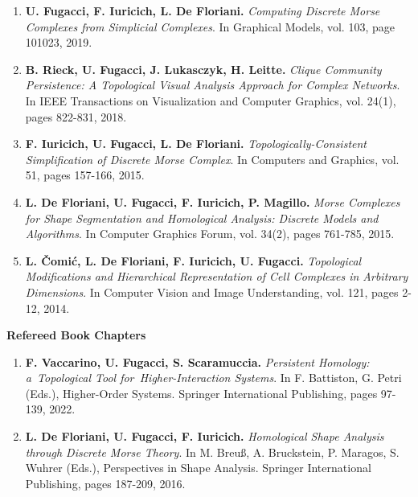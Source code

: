 \documentclass[11pt]{article}
\begin{document}
\begin{enumerate}
\item {\bf U. Fugacci, F. Iuricich, L. De Floriani.} {\em Computing Discrete Morse Complexes from Simplicial Complexes}. In Graphical Models, vol. 103, page 101023, 2019.

\item {\bf B. Rieck, U. Fugacci, J. Lukasczyk, H. Leitte.} {\em Clique Community Persistence: A Topological Visual Analysis Approach for Complex Networks}. In IEEE Transactions on Visualization and Computer Graphics, vol. 24(1), pages 822-831, 2018.

\item {\bf F. Iuricich, U. Fugacci, L. De Floriani.} {\em Topologically-Consistent Simplification of Discrete Morse Complex}. In Computers and Graphics, vol. 51, pages 157-166, 2015. %

\item {\bf L. De Floriani, U. Fugacci, F. Iuricich, P. Magillo.} {\em Morse Complexes for Shape Segmentation and Homological Analysis: Discrete Models and Algorithms}. In Computer Graphics Forum, vol. 34(2), pages 761-785, 2015.

\item {\bf L. {\v C}omi{\' c}, L. De Floriani, F. Iuricich, U. Fugacci.} {\em Topological Modifications and Hierarchical Representation of Cell Complexes in Arbitrary Dimensions}. In Computer Vision and Image Understanding, vol. 121, pages 2-12, 2014.

\end{enumerate}
\vspace*{1ex}

\noindent
{\bf Refereed Book Chapters}

\begin{enumerate}

\item {\bf F. Vaccarino, U. Fugacci, S. Scaramuccia.} {\em Persistent Homology: a Topological Tool for Higher-Interaction Systems}. In F. Battiston, G. Petri (Eds.), Higher-Order Systems. Springer International Publishing, pages 97-139, 2022.

\item {\bf L. De Floriani, U. Fugacci, F. Iuricich.} {\em Homological Shape Analysis through Discrete Morse Theory}. In M. Breu{\ss}, A. Bruckstein, P. Maragos, S. Wuhrer (Eds.), Perspectives in Shape Analysis. Springer International Publishing, pages 187-209, 2016.

\end{enumerate}
\vspace*{3ex}
\end{document}
